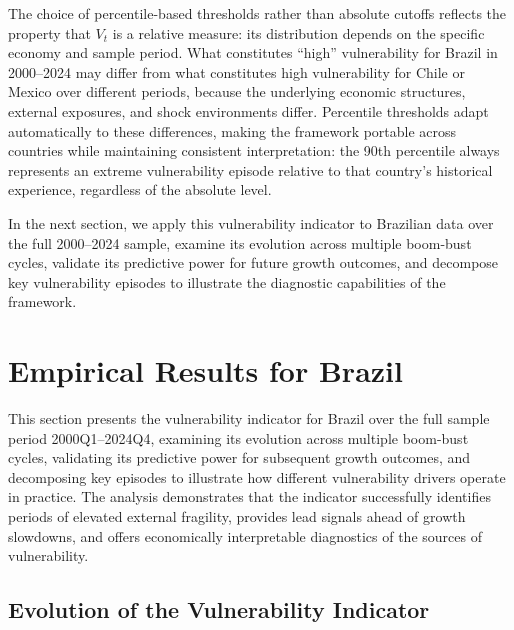 \documentclass[12pt,a4paper]{article}
\numberwithin{equation}{section}
\theoremstyle{definition}
\theoremstyle{remark}
\begin{document}
The choice of percentile-based thresholds rather than absolute cutoffs reflects the property that $V_t$ is a relative measure: its distribution depends on the specific economy and sample period. What constitutes ``high'' vulnerability for Brazil in 2000--2024 may differ from what constitutes high vulnerability for Chile or Mexico over different periods, because the underlying economic structures, external exposures, and shock environments differ. Percentile thresholds adapt automatically to these differences, making the framework portable across countries while maintaining consistent interpretation: the 90th percentile always represents an extreme vulnerability episode relative to that country's historical experience, regardless of the absolute level.

In the next section, we apply this vulnerability indicator to Brazilian data over the full 2000--2024 sample, examine its evolution across multiple boom-bust cycles, validate its predictive power for future growth outcomes, and decompose key vulnerability episodes to illustrate the diagnostic capabilities of the framework.


\section{Empirical Results for Brazil}
\label{sec:empirical}

This section presents the vulnerability indicator for Brazil over the full sample period 2000Q1--2024Q4, examining its evolution across multiple boom-bust cycles, validating its predictive power for subsequent growth outcomes, and decomposing key episodes to illustrate how different vulnerability drivers operate in practice. The analysis demonstrates that the indicator successfully identifies periods of elevated external fragility, provides lead signals ahead of growth slowdowns, and offers economically interpretable diagnostics of the sources of vulnerability.


\subsection{Evolution of the Vulnerability Indicator}
\end{document}
